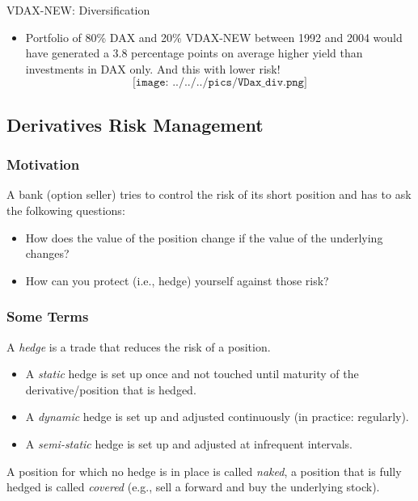 {VDAX-NEW: Diversification}
\begin{itemize}
  \item Portfolio of 80\% DAX and 20\% VDAX-NEW between
1992 and 2004 would have generated a 3.8 percentage
points on average higher yield than investments in
DAX only. And this with lower risk!
$$\texttt{[image: ../../../pics/VDax\_div.png]}$$
\end{itemize}


\subsection{Derivatives Risk Management}

\begin{frame}[fragile]
\frametitle{Motivation}
A bank (option seller) tries to control the risk of its short position and has to ask the folkowing questions:
\begin{itemize}
  \item How does the value of the position change if the value of the underlying changes?
  \item How can you protect (i.e., hedge) yourself against those risk?
\end{itemize}
\end{frame}

\begin{frame}[fragile]
\frametitle{Some Terms}
A \emph{hedge} is a trade that reduces the risk of a position.
\begin{itemize}
  \item A \emph{static} hedge is set up once and not touched until maturity of
  the derivative/position that is hedged.
  \item A \emph{dynamic} hedge is set up and adjusted continuously (in practice:
  regularly).
  \item A \emph{semi-static} hedge is set up and adjusted at infrequent
  intervals.
\end{itemize}
A position for which no hedge is in place is called \emph{naked}, a position
that is fully hedged is called \emph{covered} (e.g., sell a forward and buy the
underlying stock).
\end{frame}

